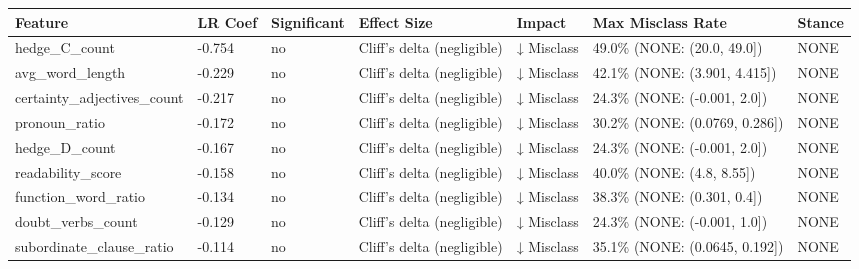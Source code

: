 \begin{tabular}{lllllll}
\toprule
Feature & LR Coef & Significant & Effect Size & Impact & Max Misclass Rate & Stance \\
\midrule
hedge\_C\_count & -0.754 & no & Cliff's delta (negligible) & ↓ Misclass & 49.0\% (NONE: (20.0, 49.0]) & NONE \\
avg\_word\_length & -0.229 & no & Cliff's delta (negligible) & ↓ Misclass & 42.1\% (NONE: (3.901, 4.415]) & NONE \\
certainty\_adjectives\_count & -0.217 & no & Cliff's delta (negligible) & ↓ Misclass & 24.3\% (NONE: (-0.001, 2.0]) & NONE \\
pronoun\_ratio & -0.172 & no & Cliff's delta (negligible) & ↓ Misclass & 30.2\% (NONE: (0.0769, 0.286]) & NONE \\
hedge\_D\_count & -0.167 & no & Cliff's delta (negligible) & ↓ Misclass & 24.3\% (NONE: (-0.001, 2.0]) & NONE \\
readability\_score & -0.158 & no & Cliff's delta (negligible) & ↓ Misclass & 40.0\% (NONE: (4.8, 8.55]) & NONE \\
function\_word\_ratio & -0.134 & no & Cliff's delta (negligible) & ↓ Misclass & 38.3\% (NONE: (0.301, 0.4]) & NONE \\
doubt\_verbs\_count & -0.129 & no & Cliff's delta (negligible) & ↓ Misclass & 24.3\% (NONE: (-0.001, 1.0]) & NONE \\
subordinate\_clause\_ratio & -0.114 & no & Cliff's delta (negligible) & ↓ Misclass & 35.1\% (NONE: (0.0645, 0.192]) & NONE \\
\bottomrule
\end{tabular}

